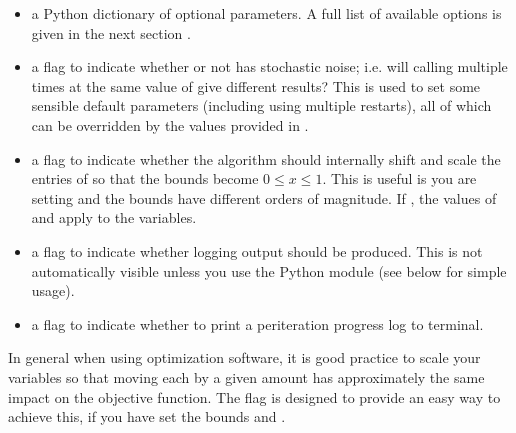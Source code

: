 \documentclass[letterpaper,10pt,english]{sphinxmanual}
\begin{document}
\begin{itemize}
\item {} 
 \sphinxhyphen{} a Python dictionary  of optional parameters. A full list of available options is given in the next section {\hyperref[\detokenize{advanced::doc}]{}}.

\item {} 
 \sphinxhyphen{} a flag to indicate whether or not  has stochastic noise; i.e. will calling  multiple times at the same value of  give different results? This is used to set some sensible default parameters (including using multiple restarts), all of which can be overridden by the values provided in .

\item {} 
 \sphinxhyphen{} a flag to indicate whether the algorithm should internally shift and scale the entries of  so that the bounds become \(0 \leq x \leq 1\). This is useful is you are setting  and the bounds have different orders of magnitude. If , the values of  and  apply to the  variables.

\item {} 
 \sphinxhyphen{} a flag to indicate whether logging output should be produced. This is not automatically visible unless you use the Python  module (see below for simple usage).

\item {} 
 \sphinxhyphen{} a flag to indicate whether to print a per\sphinxhyphen{}iteration progress log to terminal.

\end{itemize}

In general when using optimization software, it is good practice to scale your variables so that moving each by a given amount has approximately the same impact on the objective function.
The  flag is designed to provide an easy way to achieve this, if you have set the bounds  and .
\end{document}
